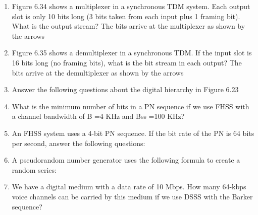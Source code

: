 \begin{enumerate}[resume]
  \item Figure 6.34 shows a multiplexer in a synchronous TDM system. Each output slot is only 10 bits long (3 bits taken from each input plus 1 framing bit). What is the output stream? The bits arrive at the multiplexer as shown by the arrows
  \item Figure 6.35 shows a demultiplexer in a synchronous TDM. If the input slot is 16 bits long (no framing bits), what is the bit stream in each output? The bits arrive at the demultiplexer as shown by the arrows
  \item Answer the following questions about the digital hierarchy in Figure 6.23
  \item What is the minimum number of bits in a PN sequence if we use FHSS with a channel bandwidth of B =4 KHz and Bss =100 KHz?
  \item An FHSS system uses a 4-bit PN sequence. If the bit rate of the PN is 64 bits per second, answer the following questions:
  \item A pseudorandom number generator uses the following formula to create a random series:
  \item We have a digital medium with a data rate of 10 Mbps. How many 64-kbps voice channels can be carried by this medium if we use DSSS with the Barker sequence?
\end{enumerate}
